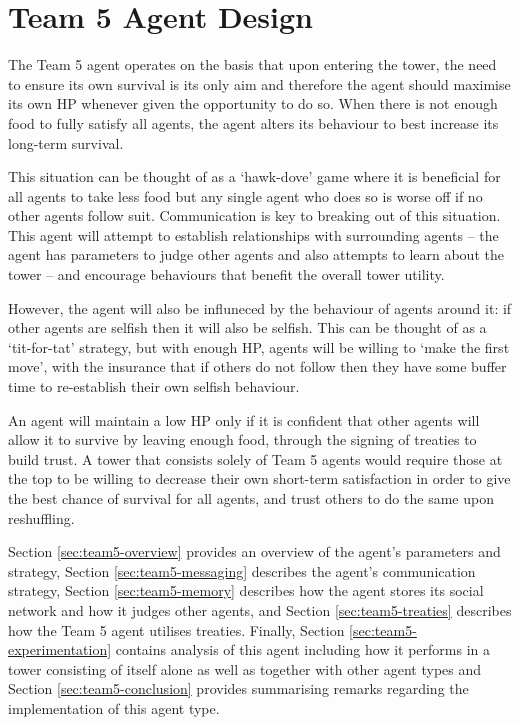 \chapter{Team 5 Agent Design}\label{team_5_agent_design}

The Team 5 agent operates on the basis that upon entering the tower, the need to ensure its own survival is its only aim and therefore the agent should maximise its own HP whenever given the opportunity to do so. When there is not enough food to fully satisfy all agents, the agent alters its behaviour to best increase its long-term survival.

This situation can be thought of as a `hawk-dove' game where it is beneficial for all agents to take less food but any single agent who does so is worse off if no other agents follow suit. Communication is key to breaking out of this situation. This agent will attempt to establish relationships with surrounding agents -- the agent has parameters to judge other agents and also attempts to learn about the tower -- and encourage behaviours that benefit the overall tower utility.

However, the agent will also be influneced by the behaviour of agents around it: if other agents are selfish then it will also be selfish. This can be thought of as a `tit-for-tat' strategy, but with enough HP, agents will be willing to `make the first move', with the insurance that if others do not follow then they have some buffer time to re-establish their own selfish behaviour.

An agent will maintain a low HP only if it is confident that other agents will allow it to survive by leaving enough food, through the signing of treaties to build trust. A tower that consists solely of Team 5 agents would require those at the top to be willing to decrease their own short-term satisfaction in order to give the best chance of survival for all agents, and trust others to do the same upon reshuffling.

Section \ref{sec:team5-overview} provides an overview of the agent's parameters and strategy, Section \ref{sec:team5-messaging} describes the agent's communication strategy, Section \ref{sec:team5-memory} describes how the agent stores its social network and how it judges other agents, and Section \ref{sec:team5-treaties} describes how the Team 5 agent utilises treaties. Finally, Section \ref{sec:team5-experimentation} contains analysis of this agent including how it performs in a tower consisting of itself alone as well as together with other agent types and Section \ref{sec:team5-conclusion} provides summarising remarks regarding the implementation of this agent type.

